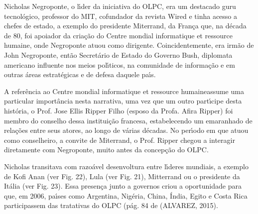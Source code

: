 \documentclass[
12pt,		%
openright,	%
twoside,  %
a4paper,			%
chapter=TITLE,		%
english,			%
french,				%
spanish,			%
brazil				%
]{USPSC-classe/USPSC}
\begin{document}
Nicholas Negroponte, o l\'{\i}der da iniciativa do OLPC, era um destacado \textquotedbl guru \textquotedbl  tecnol\'ogico, professor do MIT, cofundador da revista Wired e tinha acesso a chefes de estado, a exemplo do presidente Miterrand, da Fran\c{c}a que, na d\'ecada de 80, foi apoiador da cria\c{c}\~ao do \textquotedbl Centre mondial informatique et ressource humaine\textquotedbl , onde Negroponte atuou como dirigente. Coincidentemente, era irm\~ao de John Negroponte, ent\~ao Secret\'ario de Estado do Governo Bush, diplomata americano influente nos meios pol\'{\i}ticos, na comunidade de informa\c{c}\~ao e em outras \'areas estrat\'egicas e de defesa daquele pa\'{\i}s.

















A refer\^encia ao \textquotedbl Centre mondial informatique et ressource humaine\textquotedbl  assume uma particular import\^ancia nesta narrativa, uma vez que um outro part\'{\i}cipe desta hist\'oria, o Prof. Jose Ellis Ripper Filho (esposo da Profa. Afira Ripper) foi membro do conselho dessa institui\c{c}\~ao francesa, estabelecendo um emaranhado de rela\c{c}\~oes entre seus atores, ao longo de v\'arias d\'ecadas. No per\'{\i}odo em que atuou como conselheiro, a convite de Miterrand, o Prof. Ripper chegou a interagir diretamente com Negroponte, muito antes da concep\c{c}\~ao do OLPC.

















Nicholas transitava com razo\'avel desenvoltura entre l\'{\i}deres mundiais, a exemplo de Kofi Anan (ver Fig. 22), Lula (ver Fig. 21), Mitterrand ou o presidente da It\'alia (ver Fig. 23). Essa presen\c{c}a junto a governos criou a oportunidade para que, em 2006, pa\'{\i}ses como Argentina, Nig\'eria, China, \'India, Egito e Costa Rica participassem das tratativas do OLPC  (p\'ag. 84 de (ALVAREZ, 2015).
\end{document}
